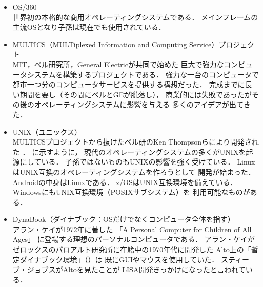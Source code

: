 \begin{itemize}
\item OS/360 \\
  世界初の本格的な商用オペレーティングシステムである．
  メインフレームの主流OSとなり子孫は現在でも使用されている\cite{os360}．

\item MULTICS（MULTiplexed Information and Computing Service）プロジェクト
  \cite{third} \\
  MIT，ベル研究所，General Electricが共同で始めた
  巨大で強力なコンピュータシステムを構築するプロジェクトである．
  強力な一台のコンピュータで
  都市一つ分のコンピュータサービスを提供する構想だった．
  完成までに長い期間を要し（その間にベルとGEが脱落し），
  商業的には失敗であったがその後のオペレーティングシステムに影響を与える
  多くのアイデアが出てきた．

\item UNIX（ユニックス） \\
  MULTICSプロジェクトから抜けたベル研のKen Thompsonらにより開発された
  \cite{unix}．
  に示すように，
  現代のオペレーティングシステムの多くがUNIXを起源にしている．
  子孫ではないものもUNIXの影響を強く受けている．
  LinuxはUNIX互換のオペレーティングシステムを作ろうとして
  開発が始まった\cite{linux}．
  Androidの中身はLinuxである\cite{android}．
  z/OSはUNIX互換環境を備えている\cite{zos}．
  WindowsにもUNIX互換環境（POSIXサブシステム）を
  利用可能なものがある\cite{windows}．

\item DynaBook（ダイナブック：OSだけでなくコンピュータ全体を指す）
  \cite{dynabook2} \\
  アラン・ケイが1972年に著した
  「A Personal Computer for Children of All Ages」\cite{key72, key72J}
  に登場する理想のパーソナルコンピュータである．
  アラン・ケイがゼロックスのパロアルト研究所に在籍中の1970年代に開発した
  Alto上の「暫定ダイナブック環境」（）は
  既にGUIやマウスを使用していた．
  スティーブ・ジョブスがAltoを見たことが
  LISA開発きっかけになったと言われている\cite{dynabook}．


\end{itemize}
